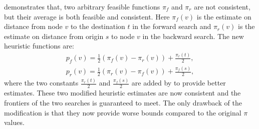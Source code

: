 \begin{comment}
\begin{figure}[H]
    \tikzstyle{main node} = [circle, draw, text centered, minimum height=2.5em]
    \tikzstyle{line} = [draw, -latex']
    \centering
    \begin{tikzpicture}[>=stealth', line width=1pt, auto, node distance=3cm]
        \node [main node] (s) at (0,0)  {s};
        \node [main node] (v) at (2,3)  {v};
        \node [main node] (w) at (7,4)  {w};
        \node [main node] (t) at (8,7)  {t};

        \path [line, dashed] (s) -- node [right] {$\pi_r(v)$} (v);
        \path [line, dashed] (s) -- node [right] {$\pi_r(w)$} (w);
        \path [line, dashed] (v) -- node {$\pi_f(v)$} (t);
        \path [line, dashed] (w) -- node [left] {$\pi_f(w)$} (t);

        \draw [line, out=300, in=200, bend left] (s.north) to node [left] {$c_{st}$} (v);
        \draw [line, out=70, in=45, bend right] (w.east) to node [right] {$c_{wt}$} (t.east);
        \draw [line] (v.east) to node [above] {$c_{vw}$} (w);
    \end{tikzpicture}
    \caption{Heuristic values for bidirectional A* search}
    \label{fig:bidirect_heuristic}
\end{figure}
\todoin[inline]{add $\pi_f(t) and \pi_r(s)$ for figure}
\end{comment}

\citet{Ikeda} demonstrates that, two arbitrary feasible functions $\pi_f$ and $\pi_r$ are not consistent, but their average is both feasible and consistent.
Here $\pi_f(v)$ is the estimate on distance from node $v$ to the destination $t$ in the forward search and $\pi_r(v)$ is the estimate on distance from origin $s$ to node $v$ in the backward search. 
The new heuristic functions are:
\begin{align}
    p_f(v) = \frac{1}{2}(\pi_f(v)-\pi_r(v)) + \frac{\pi_r(t)}{2}, \\
    p_r(v) = \frac{1}{2}(\pi_r(v)-\pi_f(v)) + \frac{\pi_f(s)}{2},
\end{align}
where the two constants $\frac{\pi_r(t)}{2}$ and $\frac{\pi_f(s)}{2}$ are added by \citet{GoldbergEPP} to provide better estimates.
These two modified heuristic estimates are now consistent and the frontiers of the two searches is guaranteed to meet.
The only drawback of the modification is that they now provide worse bounds compared to the original $\pi$ values.

